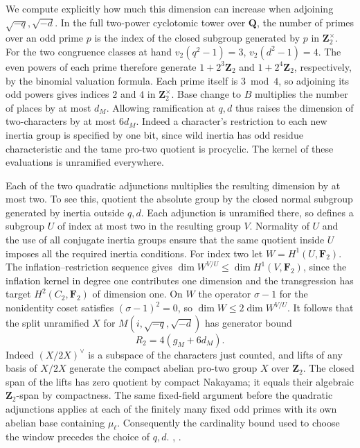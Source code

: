 We compute explicitly how much this dimension can increase when
adjoining \(\sqrt{-q},\sqrt{-d}\). In the full two-power cyclotomic
tower over \(\mathbf Q\), the number of primes over an odd prime \(p\)
is the index of the closed subgroup generated by \(p\) in
\(\mathbf Z_2^\times\). For the two congruence classes at hand
\(v_2(q^2-1)=3\), \(v_2(d^2-1)=4\). The even powers of each
prime therefore generate \(1+2^3\mathbf Z_2\) and
\(1+2^4\mathbf Z_2\), respectively, by the binomial valuation formula.
Each prime itself is \(3\bmod4\), so adjoining its odd powers gives
indices \(2\) and \(4\) in \(\mathbf Z_2^\times\). Base change to
\(B\) multiplies the number of places by at most \(d_M\).
Allowing ramification at \(q,d\) thus raises the dimension of
two-characters by at most \(6d_M\). Indeed a character's restriction
to each new inertia group is specified by one bit, since wild inertia
has odd residue characteristic and the tame pro-two quotient is
procyclic. The kernel of these evaluations is unramified everywhere.

Each of the two quadratic adjunctions multiplies the resulting dimension
by at most two. To see this, quotient the absolute group by the closed
normal subgroup generated by inertia outside \(q,d\). Each adjunction
is unramified there, so defines a subgroup \(U\) of index at most two
in the resulting group \(V\). Normality of \(U\) and the use of all
conjugate inertia groups ensure that the same quotient inside \(U\)
imposes all the required inertia conditions. For index two let
\(W=H^1(U,\mathbf F_2)\). The inflation--restriction sequence gives
\(\dim W^{V/U}\le\dim H^1(V,\mathbf F_2)\), since the inflation kernel
in degree one contributes one dimension and the transgression has
target \(H^2(C_2,\mathbf F_2)\) of dimension one. On \(W\) the
operator \(\sigma-1\) for the nonidentity coset satisfies
\((\sigma-1)^2=0\), so \(\dim W\le2\dim W^{V/U}\).
It follows that the split unramified \(X\) for
\(M(i,\sqrt{-q},\sqrt{-d})\) has generator bound
\[
 R_2=4(g_M+6d_M).
\]
Indeed \((X/2X)^\vee\) is a subspace of the characters just counted,
and lifts of any basis of \(X/2X\) generate the compact abelian
pro-two group \(X\) over \(\mathbf Z_2\). The closed span of the
lifts has zero quotient by compact Nakayama; it equals their algebraic
\(\mathbf Z_2\)-span by compactness. The same fixed-field argument
before the quadratic adjunctions applies at each of the finitely many
fixed odd primes with its own abelian base containing \(\mu_\ell\).
Consequently the cardinality bound used to choose the window precedes
the choice of \(q,d\).
,
.

